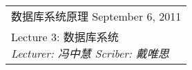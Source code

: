 \clearpage \noindent\begin{tabularx}{\linewidth}{|X|}
\hline \vskip -2mm
{\sf 数据库系统原理} \hfill September 6, 2011 \\
{\centering \sf \large Lecture 3:
数据库系统 \\ }
\textsl{Lecturer: 冯中慧 \hfill Scriber: 戴唯思}\\ \hline
\end{tabularx}
\setcounter{section}{0}
\renewcommand{\thepage}{\lecture -\arabic{page}}
\def\lecture{3}


